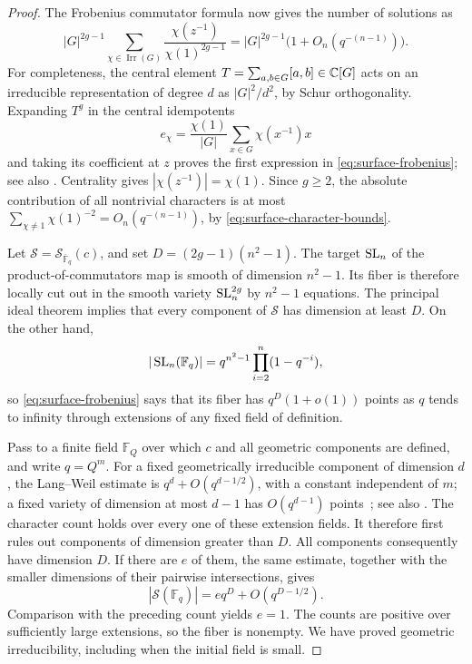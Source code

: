 \begin{proof}
The Frobenius commutator formula now gives the number of solutions as
\begin{equation}\label{eq:surface-frobenius}
 |G|^{2g-1}\sum_{\chi\in\operatorname{Irr}(G)}
          \frac{\chi(z^{-1})}{\chi(1)^{2g-1}}
 =|G|^{2g-1}\bigl(1+O_n(q^{-(n-1)})\bigr).
\end{equation}
For completeness, the central element
\(T=\sum_{a,b\in G}[a,b]\in\mathbb C[G]\) acts on an irreducible
representation of degree \(d\) as \(|G|^2/d^2\), by Schur
orthogonality.  Expanding \(T^g\) in the central idempotents
\[
 e_\chi=\frac{\chi(1)}{|G|}
             \sum_{x\in G}\chi(x^{-1})x
\]
and taking its coefficient at \(z\) proves the first expression
in \eqref{eq:surface-frobenius}; see also
\cite[Lemma~3.1(i)]{LiebeckShalev2005}.
Centrality gives \(|\chi(z^{-1})|=\chi(1)\).  Since \(g\geq2\),
the absolute contribution of all nontrivial characters is at most
\(\sum_{\chi\ne1}\chi(1)^{-2}=O_n(q^{-(n-1)})\), by
\eqref{eq:surface-character-bounds}.

Let \(\mathcal S=\mathcal S_{\overline{\mathbb F}_q}(c)\), and set
\(D=(2g-1)(n^2-1)\).  The target \(\operatorname{SL}_n\) of the product-of-commutators
map is smooth of dimension \(n^2-1\).  Its fiber is therefore locally
cut out in the smooth variety \(\operatorname{SL}_n^{2g}\) by \(n^2-1\) equations.
The principal ideal theorem implies that every component of
\(\mathcal S\) has dimension at least \(D\).
On the other hand,
\[
 |\operatorname{SL}_n(\mathbb F_q)|
       =q^{n^2-1}\prod_{i=2}^n(1-q^{-i}),
\]
so \eqref{eq:surface-frobenius} says that its fiber has
\(q^D(1+o(1))\) points as \(q\) tends to infinity through extensions
of any fixed field of definition.

Pass to a finite field \(\mathbb F_Q\) over which \(c\) and all
geometric components are defined, and write \(q=Q^m\).
For a fixed geometrically irreducible component of dimension \(d\),
the Lang--Weil estimate is \(q^d+O(q^{d-1/2})\), with a constant
independent of \(m\); a fixed variety of dimension at most \(d-1\)
has \(O(q^{d-1})\) points~\cite{LangWeil1954}; see also
\cite[Theorem~7.7.1]{Poonen2017}.
The character count holds over every one of these extension fields.
It therefore first rules out components of dimension greater than
\(D\).  All components consequently have dimension
\(D\).  If there are \(e\) of them, the same estimate, together with
the smaller dimensions of their pairwise intersections, gives
\[
 |\mathcal S(\mathbb F_q)|=e q^D+O(q^{D-1/2}).
\]
Comparison with the preceding count yields \(e=1\).  The counts
are positive over sufficiently large extensions, so the fiber is
nonempty.  We have proved geometric irreducibility, including when
the initial field is small.


\end{proof}

